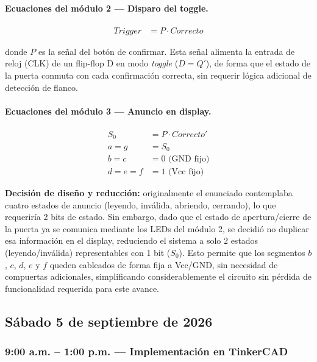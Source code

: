 \documentclass[11pt]{article}
\begin{document}
\paragraph{Ecuaciones del módulo 2 --- Disparo del toggle.}

\begin{align*}
Trigger &= P \cdot Correcto
\end{align*}

donde $P$ es la señal del botón de confirmar. Esta señal alimenta la
entrada de reloj (CLK) de un flip-flop D en modo \emph{toggle} ($D = Q'$),
de forma que el estado de la puerta conmuta con cada confirmación
correcta, sin requerir lógica adicional de detección de flanco.

\paragraph{Ecuaciones del módulo 3 --- Anuncio en display.}

\begin{align*}
S_0 &= P \cdot Correcto' \\
a = g &= S_0 \\
b = c &= 0 \text{ (GND fijo)} \\
d = e = f &= 1 \text{ (Vcc fijo)}
\end{align*}

\textbf{Decisión de diseño y reducción:} originalmente el enunciado
contemplaba cuatro estados de anuncio (leyendo, inválida, abriendo,
cerrando), lo que requeriría 2 bits de estado. Sin embargo, dado que el
estado de apertura/cierre de la puerta ya se comunica mediante los LEDs
del módulo 2, se decidió no duplicar esa información en el display,
reduciendo el sistema a solo 2 estados (leyendo/inválida) representables
con 1 bit ($S_0$). Esto permite que los segmentos $b$, $c$, $d$, $e$ y $f$
queden cableados de forma fija a Vcc/GND, sin necesidad de compuertas
adicionales, simplificando considerablemente el circuito sin pérdida de
funcionalidad requerida para este avance.

\subsection{Sábado 5 de septiembre de 2026}

\subsubsection{9:00 a.m. -- 1:00 p.m. --- Implementación en TinkerCAD}
\end{document}
